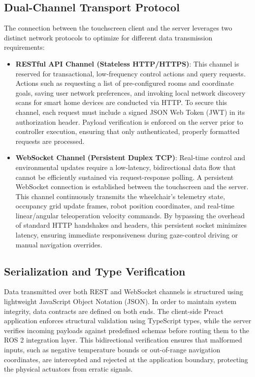 \subsection{Dual-Channel Transport Protocol}
The connection between the touchscreen client and the server leverages two distinct network protocols to optimize for different data transmission requirements:
\begin{itemize}
    \item \textbf{RESTful API Channel (Stateless HTTP/HTTPS)}: This channel is reserved for transactional, low-frequency control actions and query requests. Actions such as requesting a list of pre-configured rooms and coordinate goals, saving user network preferences, and invoking local network discovery scans for smart home devices are conducted via HTTP. To secure this channel, each request must include a signed JSON Web Token (JWT) in its authorization header. Payload verification is enforced on the server prior to controller execution, ensuring that only authenticated, properly formatted requests are processed.
    \item \textbf{WebSocket Channel (Persistent Duplex TCP)}: Real-time control and environmental updates require a low-latency, bidirectional data flow that cannot be efficiently sustained via request-response polling. A persistent WebSocket connection is established between the touchscreen and the server. This channel continuously transmits the wheelchair's telemetry state, occupancy grid update frames, robot position coordinates, and real-time linear/angular teleoperation velocity commands. By bypassing the overhead of standard HTTP handshakes and headers, this persistent socket minimizes latency, ensuring immediate responsiveness during gaze-control driving or manual navigation overrides.
\end{itemize}

\subsection{Serialization and Type Verification}
Data transmitted over both REST and WebSocket channels is structured using lightweight JavaScript Object Notation (JSON). In order to maintain system integrity, data contracts are defined on both ends. The client-side Preact application enforces structural validation using TypeScript types, while the server verifies incoming payloads against predefined schemas before routing them to the ROS 2 integration layer. This bidirectional verification ensures that malformed inputs, such as negative temperature bounds or out-of-range navigation coordinates, are intercepted and rejected at the application boundary, protecting the physical actuators from erratic signals.

